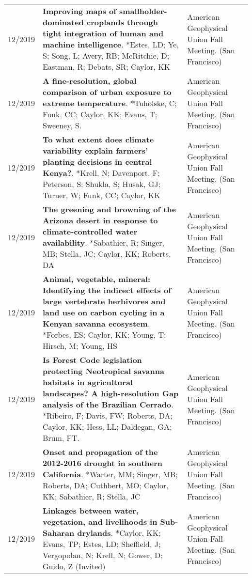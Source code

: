 \begin{longtable}{lp{9.0cm}p{4.5cm}}
12/2019 & {\bf Improving maps of smallholder-dominated croplands through tight integration of human and machine intelligence}. *Estes, LD; Ye, S; Song, L; Avery, RB; McRitchie, D; Eastman, R; Debats, SR; Caylor, KK  & American Geophysical Union Fall Meeting. (San Francisco) \\
  
12/2019 & {\bf A fine-resolution, global comparison of urban exposure to extreme temperature}. *Tuholske, C; Funk, CC; Caylor, KK; Evans, T; Sweeney, S.  & American Geophysical Union Fall Meeting. (San Francisco) \\
  
12/2019 & {\bf To what extent does climate variability explain farmers' planting decisions in central Kenya?}. *Krell, N; Davenport, F; Peterson, S; Shukla, S; Husak, GJ; Turner, W; Funk, CC; Caylor, KK  & American Geophysical Union Fall Meeting. (San Francisco) \\
  
12/2019 & {\bf The greening and browning of the Arizona desert in response to climate-controlled water availability}. *Sabathier, R; Singer, MB; Stella, JC; Caylor, KK; Roberts, DA  & American Geophysical Union Fall Meeting. (San Francisco) \\
  
12/2019 & {\bf Animal, vegetable, mineral: Identifying the indirect effects of large vertebrate herbivores and land use on carbon cycling in a Kenyan savanna ecosystem}. *Forbes, ES; Caylor, KK; Young, T; Hirsch, M; Young, HS  & American Geophysical Union Fall Meeting. (San Francisco) \\
  
12/2019 & {\bf Is Forest Code legislation protecting Neotropical savanna habitats in agricultural landscapes? A high-resolution Gap analysis of the Brazilian Cerrado}. *Ribeiro, F; Davis, FW; Roberts, DA; Caylor, KK; Hess, LL; Daldegan, GA; Brum, FT.   & American Geophysical Union Fall Meeting. (San Francisco) \\
  
12/2019 & {\bf Onset and propagation of the 2012-2016 drought in southern California}. *Warter, MM; Singer, MB; Roberts, DA; Cuthbert, MO; Caylor, KK; Sabathier, R; Stella, JC  & American Geophysical Union Fall Meeting. (San Francisco) \\
  
12/2019 & {\bf Linkages between water, vegetation, and livelihoods in Sub-Saharan drylands}. *Caylor, KK; Evans, TP; Estes, LD; Sheffield, J; Vergopolan, N; Krell, N;  Gower, D; Guido, Z  (Invited)  & American Geophysical Union Fall Meeting. (San Francisco) \\
  

\end{longtable}
